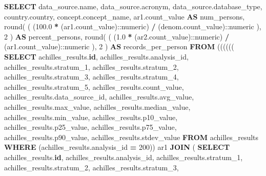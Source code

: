 \documentclass[
]{book}
\newenvironment{Shaded}{\begin{snugshade}}{\end{snugshade}}
\newcommand{\CharTok}[1]{\textcolor[rgb]{0.31,0.60,0.02}{#1}}
\newcommand{\DecValTok}[1]{\textcolor[rgb]{0.00,0.00,0.81}{#1}}
\newcommand{\FloatTok}[1]{\textcolor[rgb]{0.00,0.00,0.81}{#1}}
\newcommand{\FunctionTok}[1]{\textcolor[rgb]{0.00,0.00,0.00}{#1}}
\newcommand{\KeywordTok}[1]{\textcolor[rgb]{0.13,0.29,0.53}{\textbf{#1}}}
\newcommand{\NormalTok}[1]{#1}
\newcommand{\OperatorTok}[1]{\textcolor[rgb]{0.81,0.36,0.00}{\textbf{#1}}}
\begin{document}
\begin{Shaded}
\begin{Highlighting}[]
\KeywordTok{SELECT}\NormalTok{ data\_source.name,}
\NormalTok{   data\_source.acronym,}
\NormalTok{   data\_source.database\_type,}
\NormalTok{   country.country,}
\NormalTok{   concept.concept\_name,}
\NormalTok{   ar1.count\_value }\KeywordTok{AS}\NormalTok{ num\_persons,}
   \FunctionTok{round}\NormalTok{(}
\NormalTok{     (}
\NormalTok{       (}\FloatTok{100.0} \OperatorTok{*}\NormalTok{ (ar1.count\_value):}\CharTok{:numeric}\NormalTok{)}
       \OperatorTok{/}
\NormalTok{       (denom.count\_value):}\CharTok{:numeric}
\NormalTok{     ),}
     \DecValTok{2}
\NormalTok{   ) }\KeywordTok{AS}\NormalTok{ percent\_persons,}
   \FunctionTok{round}\NormalTok{(}
\NormalTok{     (}
\NormalTok{       (}\FloatTok{1.0} \OperatorTok{*}\NormalTok{ (ar2.count\_value):}\CharTok{:numeric}\NormalTok{)}
       \OperatorTok{/}
\NormalTok{       (ar1.count\_value):}\CharTok{:numeric}
\NormalTok{     ),}
     \DecValTok{2}
\NormalTok{   ) }\KeywordTok{AS}\NormalTok{ records\_per\_person}
  \KeywordTok{FROM}\NormalTok{ (((((( }\KeywordTok{SELECT}\NormalTok{ achilles\_results.}\KeywordTok{id}\NormalTok{,}
\NormalTok{           achilles\_results.analysis\_id,}
\NormalTok{           achilles\_results.stratum\_1,}
\NormalTok{           achilles\_results.stratum\_2,}
\NormalTok{           achilles\_results.stratum\_3,}
\NormalTok{           achilles\_results.stratum\_4,}
\NormalTok{           achilles\_results.stratum\_5,}
\NormalTok{           achilles\_results.count\_value,}
\NormalTok{           achilles\_results.data\_source\_id,}
\NormalTok{           achilles\_results.avg\_value,}
\NormalTok{           achilles\_results.max\_value,}
\NormalTok{           achilles\_results.median\_value,}
\NormalTok{           achilles\_results.min\_value,}
\NormalTok{           achilles\_results.p10\_value,}
\NormalTok{           achilles\_results.p25\_value,}
\NormalTok{           achilles\_results.p75\_value,}
\NormalTok{           achilles\_results.p90\_value,}
\NormalTok{           achilles\_results.stdev\_value}
          \KeywordTok{FROM}\NormalTok{ achilles\_results}
         \KeywordTok{WHERE}\NormalTok{ (achilles\_results.analysis\_id }\OperatorTok{=} \DecValTok{200}\NormalTok{)) ar1}
    \KeywordTok{JOIN}\NormalTok{ ( }\KeywordTok{SELECT}\NormalTok{ achilles\_results.}\KeywordTok{id}\NormalTok{,}
\NormalTok{           achilles\_results.analysis\_id,}
\NormalTok{           achilles\_results.stratum\_1,}
\NormalTok{           achilles\_results.stratum\_2,}
\NormalTok{           achilles\_results.stratum\_3,}

\end{Highlighting}
\end{Shaded}
\end{document}
